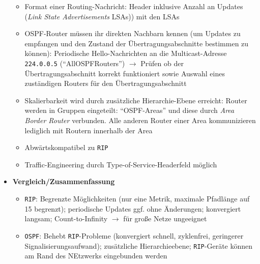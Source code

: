 \begin{itemize}
\begin{itemize}
		\item Format einer Routing-Nachricht: Header inklusive Anzahl an Updates (\textit{Link State Advertisements} LSAs)) mit den LSAs
		\item OSPF-Router müssen ihr direkten Nachbarn kennen (um Updates zu empfangen und den Zustand der Übertragungsabschnitte bestimmen zu können): Periodische Hello-Nachrichten an die Multicast-Adresse \texttt{224.0.0.5} ("`AllOSPFRouters"') \(\rightarrow\) Prüfen ob der Übertragungsabschnitt korrekt funktioniert sowie Auswahl eines zuständigen Routers für den Übertragungsabschnitt
		\item Skalierbarkeit wird durch zusätzliche Hierarchie-Ebene erreicht: Router werden in Gruppen eingeteilt: "`OSPF-Areas"' und diese durch \textit{Area Border Router} verbunden. Alle anderen Router einer Area kommunizieren lediglich mit Routern innerhalb der Area
		\item Abwärtskompatibel zu \texttt{RIP}
		\item Traffic-Engineering durch Type-of-Service-Headerfeld möglich
	\end{itemize}
	\item \textbf{Vergleich/Zusammenfassung}
	\begin{itemize}
		\item \texttt{RIP}: Begrenzte Möglichkeiten (nur eine Metrik, maximale Pfadlänge auf 15 begrenzt); periodische Updates ggf. ohne Änderungen; konvergiert langsam; Count-to-Infinity \(\rightarrow\) für große Netze ungeeignet
		\item \texttt{OSPF}: Behebt \texttt{RIP}-Probleme (konvergiert schnell, zyklenfrei, geringerer Signalisierungsaufwand); zusätzliche Hierarchieebene; \texttt{RIP}-Geräte können am Rand des NEtzwerks eingebunden werden
	\end{itemize}
\end{itemize}

